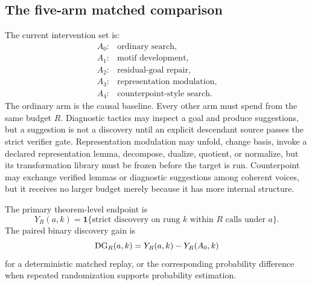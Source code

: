 \subsection{The five-arm matched comparison}
The current intervention set is:
\[
\begin{array}{ll}
A_0:&\text{ordinary search},\\
A_1:&\text{motif development},\\
A_2:&\text{residual-goal repair},\\
A_3:&\text{representation modulation},\\
A_4:&\text{counterpoint-style search}.
\end{array}
\]
The ordinary arm is the causal baseline. Every other arm must spend from the same budget $R$. Diagnostic tactics may inspect a goal and produce suggestions, but a suggestion is not a discovery until an explicit descendant source passes the strict verifier gate. Representation modulation may unfold, change basis, invoke a declared representation lemma, decompose, dualize, quotient, or normalize, but its transformation library must be frozen before the target is run. Counterpoint may exchange verified lemmas or diagnostic suggestions among coherent voices, but it receives no larger budget merely because it has more internal structure.

The primary theorem-level endpoint is
\[
Y_R(a,k)=\mathbf 1\{\text{strict discovery on rung }k\text{ within }R\text{ calls under }a\}.
\]
The paired binary discovery gain is
\[
\operatorname{DG}_R(a,k)=Y_R(a,k)-Y_R(A_0,k)
\]
for a deterministic matched replay, or the corresponding probability difference when repeated randomization supports probability estimation.

